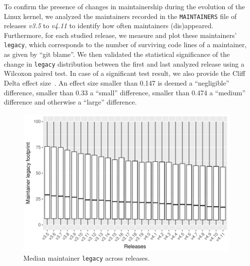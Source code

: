 To confirm the presence of changes in maintainership during the evolution of the Linux kernel, we analyzed the maintainers recorded in the \texttt{MAINTAINERS} file of releases \textit{v3.5} to \textit{v4.11} to identify how often maintainers (dis)appeared. %
Furthermore, for each studied release, we measure and plot these maintainers' \texttt{legacy}, which corresponds to the number of surviving code lines of a maintainer, as given by ``git blame''. %
We then validated the statistical significance of the change in \texttt{legacy} distribution between the first and last analyzed release using a Wilcoxon paired test. %
In case of a significant test result, we also provide the Cliff Delta effect size~\cite{Romano:2006}. An effect size smaller than 0.147 is deemed a ``negligible'' difference, smaller than 0.33 a ``small'' difference, smaller than 0.474 a ``medium'' difference and otherwise a ``large'' difference.


\begin{figure}[t]
  \centering
  \includegraphics[scale=.6]{plots/RQ1_median_LOC}
  \caption{Median maintainer \texttt{legacy} across releases.}
  \label{fig:RQ1_temp}
\end{figure}


